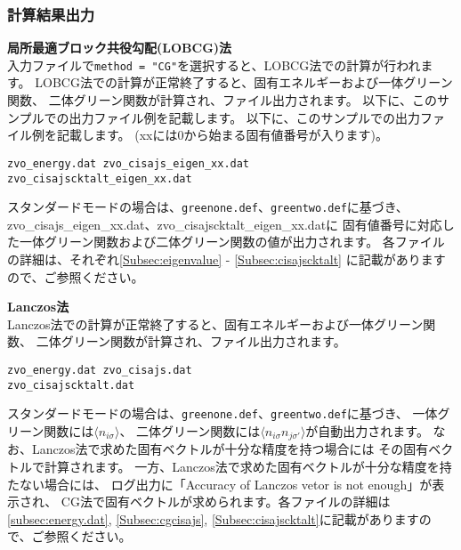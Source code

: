 \subsubsection{計算結果出力}
\begin{description}

\item {\bf 局所最適ブロック共役勾配(LOBCG)法}\\
入力ファイルで\verb|method = "CG"|を選択すると、LOBCG法での計算が行われます。
LOBCG法での計算が正常終了すると、固有エネルギーおよび一体グリーン関数、
  二体グリーン関数が計算され、ファイル出力されます。
以下に、このサンプルでの出力ファイル例を記載します。
以下に、このサンプルでの出力ファイル例を記載します。
(xxには0から始まる固有値番号が入ります)。

\begin{minipage}{14cm}
\begin{screen}
\begin{verbatim}
zvo_energy.dat zvo_cisajs_eigen_xx.dat
zvo_cisajscktalt_eigen_xx.dat
\end{verbatim}
\end{screen}
\end{minipage}

スタンダードモードの場合は、\verb|greenone.def|、\verb|greentwo.def|に基づき、
zvo\_cisajs\_eigen\_xx.dat、zvo\_cisajscktalt\_eigen\_xx.datに
固有値番号に対応した一体グリーン関数および二体グリーン関数の値が出力されます。
各ファイルの詳細は、それぞれ\ref{Subsec:eigenvalue} - \ref{Subsec:cisajscktalt}
に記載がありますので、ご参照ください。
  
\item {\bf Lanczos法}\\
  Lanczos法での計算が正常終了すると、固有エネルギーおよび一体グリーン関数、
  二体グリーン関数が計算され、ファイル出力されます。
  
\begin{minipage}{12cm}
\begin{screen}
\begin{verbatim}
zvo_energy.dat zvo_cisajs.dat 
zvo_cisajscktalt.dat  
\end{verbatim}
\end{screen}
\end{minipage}

スタンダードモードの場合は、\verb|greenone.def|、\verb|greentwo.def|に基づき、
一体グリーン関数には$\langle n_{i\sigma} \rangle$、
二体グリーン関数には$\langle n_{i\sigma} n_{j\sigma'} \rangle$が自動出力されます。
なお、Lanczos法で求めた固有ベクトルが十分な精度を持つ場合には
その固有ベクトルで計算されます。
一方、Lanczos法で求めた固有ベクトルが十分な精度を持たない場合には、
ログ出力に「Accuracy of Lanczos vetor is not enough」が表示され、
CG法で固有ベクトルが求められます。各ファイルの詳細は\ref{subsec:energy.dat},
\ref{Subsec:cgcisajs}, \ref{Subsec:cisajscktalt}に記載がありますので、ご参照ください。


\end{description}
